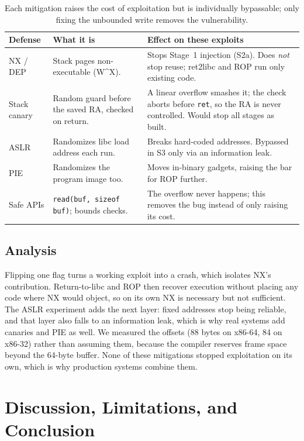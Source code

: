 \documentclass[10pt,twocolumn,letterpaper]{article}
\newcommand{\code}[1]{\texttt{\small #1}}
\begin{document}
\begin{table}[t]
  \centering
  \caption{Each mitigation raises the cost of exploitation but is individually bypassable; only fixing the unbounded write removes the vulnerability.}
  \label{tab:defenses}
  \small
  \begin{tabularx}{\textwidth}{@{}l X X@{}}
    \toprule
    \textbf{Defense} & \textbf{What it is} & \textbf{Effect on these exploits}\\
    \midrule
    NX / DEP & Stack pages non-executable (W\^{}X). & Stops Stage~1 injection (S2a). Does \emph{not} stop reuse; ret2libc and ROP run only existing code.\\
    Stack canary & Random guard before the saved RA, checked on return. & A linear overflow smashes it; the check aborts before \code{ret}, so the RA is never controlled. Would stop all stages as built.\\
    ASLR & Randomizes libc load address each run. & Breaks hard-coded addresses. Bypassed in S3 only via an information leak.\\
    PIE & Randomizes the program image too. & Moves in-binary gadgets, raising the bar for ROP further.\\
    Safe APIs & \code{read(buf, sizeof buf)}; bounds checks. & The overflow never happens; this removes the bug instead of only raising its cost.\\
    \bottomrule
  \end{tabularx}
\end{table}

\subsection{Analysis}
Flipping one flag turns a working exploit into a crash, which isolates NX's
contribution. Return-to-libc and ROP then recover execution without placing any
code where NX would object, so on its own NX is necessary but not sufficient.
The ASLR experiment adds the next layer: fixed addresses stop being reliable,
and that layer also falls to an information leak, which is why real systems add
canaries and PIE as well. We measured the offsets (88 bytes on x86-64, 84 on
x86-32) rather than assuming them, because the compiler reserves frame space
beyond the 64-byte buffer. None of these mitigations stopped exploitation on its
own, which is why production systems combine them.

\section{Discussion, Limitations, and Conclusion}
\end{document}

